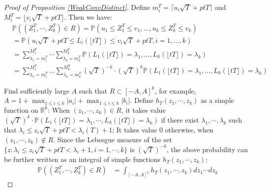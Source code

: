 \begin{proof}[Proof of Proposition \ref{WeakConvDistinct}]
Define $m_{i}^{T}=\lceil u_{i}\sqrt{T}+ptT\rceil$ and $M_{i}^{T}=\lfloor v_{i}\sqrt{T}+ptT\rfloor$. Then we have:
\begin{align*}
&\mathbb{P}\left((Z_{1}^{T},\cdots,Z_{k}^{T})\in R\right)=\mathbb{P}\left(u_{1}\leq Z_{1}^{T} \leq v_{1}, \dots,  u_{k}\leq Z_{k}^{T} \leq v_{k}\right)\\
&=\mathbb{P}\left(u_{i}\sqrt{T}+ptT\leq L_{i}(\lfloor tT\rfloor) \leq v_{i}\sqrt{T}+ptT, i=1,\dots, k\right)\\
&=\sum_{\lambda_{1}=m_{1}^{T}}^{M_{1}^{T}}\cdots\sum_{\lambda_{k}=m_{k}^{T}}^{M_{k}^{T}}\mathbb{P}(L_{1}(\lfloor tT \rfloor)=\lambda_{1},\dots,L_{k}(\lfloor tT \rfloor)=\lambda_{k})\\
&=\sum_{\lambda_{1}=m_{1}^{T}}^{M_{1}^{T}}\dots\sum_{\lambda_{k}=m_{k}^{T}}^{M_{k}^{T}}(\sqrt{T})^{-k}\cdot(\sqrt{T})^{k}\mathbb{P}(L_{1}(\lfloor tT \rfloor)=\lambda_{1},\dots,L_{k}(\lfloor tT \rfloor)=\lambda_{k})
\end{align*}

Find sufficiently large $A$ such that $R\subset[-A,A]^{k}$, for example, $A=1+\max_{1\leq i\leq k}|a_{i}|+\max_{1\leq i\leq k}|b_{i}|$. Define $h_{T}(z_{1},\cdots,z_{k})$ as a simple function on $\mathbb{R}^{k}$: When $(z_{1},\cdots,z_{k})\in R$, it takes value $(\sqrt{T})^{k}\cdot\mathbb{P}(L_{1}(\lfloor tT \rfloor)=\lambda_{1},\cdots,L_{k}(\lfloor tT \rfloor)=\lambda_{k}) $ if there exist $\lambda_{1},\cdots,\lambda_{k}$ such that $\lambda_{i}\leq z_{i}\sqrt{T}+ptT<\lambda_{i}(T)+1$; It takes value $0$ otherwise, when $(z_{1},\cdots,z_{k})\notin R$.  Since the Lebesgue measure of the set $\{z:\lambda_{i}\leq z_{i}\sqrt{T}+ptT<\lambda_{i}+1,i=1,\cdots,k\}$ is $(\sqrt{T})^{-k}$, the above probability can be further written as an integral of simple functions $h_{T}(z_{1},\cdots,z_{k})$:
\begin{align*}
\mathbb{P}((Z_{1}^{T},\cdots,Z_{k}^{T})\in R)&=\int_{[-A,A]^{k}}h_{T}(z_{1},\cdots,z_{k})dz_{1}\cdots dz_{k}
\end{align*}


\end{proof}
